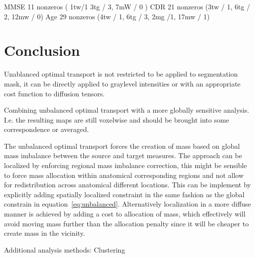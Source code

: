 \documentclass{llncs}
\begin{document}
MMSE  11 nonzeros ( 1tw/1 3tg / 3, 7mW / 0 )
CDR 21 nonzeros (3tw / 1, 6tg / 2, 12mw / 0)
Age 29 nonzeros (4tw / 1, 6tg / 3, 2mg /1, 17mw / 1) 


\section{Conclusion}

Unablanced optimal transport is not restricted to be applied to segmentation
mask, it can be directly applied to graylevel intensities or with an
appropriate cost function to diffusion tensors. 


Combining unbalanced optimal transport with a more globally sensitive analysis.
I.e. the resulting maps are still voxelwise and should be brought into some
correspondence or averaged.

The unbalanced optimal transport forces the creation of mass based on global
mass imbalance between the source and target measures. The approach can be
localized by enforcing regional mass imbalance correction, this might be
sensible to force mass allocation within anatomical corresponding regions and not
allow for redistribution across anatomical different locations. This can be
implement by explicitly adding spatially localized constraint in the same
fashion as the global constrain in equation~\ref{eq:unbalanced}. Alternatively
localization in a more diffuse manner is achieved by adding a cost to
allocation of mass, which effectively will avoid moving mass further than the
allocation penalty since it will be cheaper to create mass in the vicinity.

Additional analysis methods: Clustering



\end{document}
